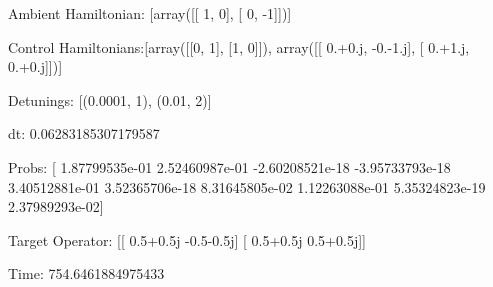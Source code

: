 \documentclass{article}
\begin{document}
    

\newpage

Ambient Hamiltonian: [array([[ 1,  0],
       [ 0, -1]])]

Control Hamiltonians:[array([[0, 1],
       [1, 0]]), array([[ 0.+0.j, -0.-1.j],
       [ 0.+1.j,  0.+0.j]])]

Detunings: [(0.0001, 1), (0.01, 2)]

 dt: 0.06283185307179587

Probs: [  1.87799535e-01   2.52460987e-01  -2.60208521e-18  -3.95733793e-18
   3.40512881e-01   3.52365706e-18   8.31645805e-02   1.12263088e-01
   5.35324823e-19   2.37989293e-02]

Target Operator: [[ 0.5+0.5j -0.5-0.5j]
 [ 0.5+0.5j  0.5+0.5j]]

Time: 754.6461884975433
\end{document}
